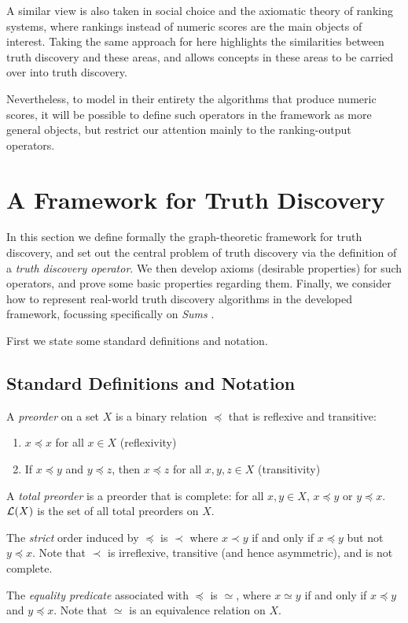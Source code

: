 \documentclass[../main.tex]{subfiles}
\begin{document}
A similar view is also taken in social choice and the axiomatic theory of
ranking systems, where rankings instead of numeric scores are the main objects
of interest. Taking the same approach for here highlights the similarities
between truth discovery and these areas, and allows concepts in these areas to
be carried over into truth discovery.

Nevertheless, to model in their entirety the algorithms that produce numeric
scores, it will be possible to define such operators in the framework as more
general objects, but restrict our attention mainly to the ranking-output
operators.

\section{A Framework for Truth Discovery}
\label{sec:theory_framework}

In this section we define formally the graph-theoretic framework for truth
discovery, and set out the central problem of truth discovery via the
definition of a \emph{truth discovery operator}. We then develop axioms
(desirable properties) for such operators, and prove some basic properties
regarding them. Finally, we consider how to represent real-world truth
discovery algorithms in the developed framework, focussing specifically on
\emph{Sums} \cite{pasternack}.

First we state some standard definitions and notation.

\subsection{Standard Definitions and Notation}

\begin{definition}
A \emph{preorder} on a set $X$ is a binary relation $\preceq$ that is reflexive
and transitive:
\begin{enumerate}
\item $x \preceq x$ for all $x \in X$ (reflexivity)
\item If $x \preceq y$ and $y \preceq z$, then $x \preceq z$ for all $x, y, z
\in X$ (transitivity)
\end{enumerate}

A \emph{total preorder} is a preorder that is complete: for all $x, y \in X$,
$x \preceq y$ or $y \preceq x$. $\mathcal{L}(X)$ is the set of all total
preorders on $X$.

The \emph{strict} order induced by $\preceq$ is $\prec$ where $x \prec y$ if
and only if $x \preceq y$ but not $y \preceq x$. Note that $\prec$ is
irreflexive, transitive (and hence asymmetric), and is not complete.

The \emph{equality predicate} associated with $\preceq$ is $\simeq$, where $x
\simeq y$ if and only if $x \preceq y$ and $y \preceq x$. Note that $\simeq$ is
an equivalence relation on $X$.

\end{definition}
\end{document}
